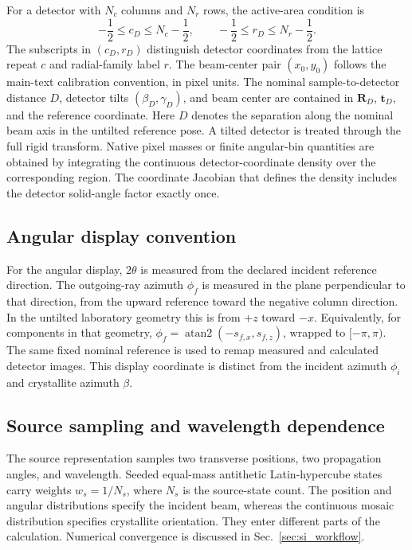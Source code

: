 For a detector with $N_c$ columns and $N_r$ rows, the active-area condition is
\begin{equation}
-\frac12\leq c_D\leq N_c-\frac12,
\qquad
-\frac12\leq r_D\leq N_r-\frac12.
\label{eq:si_detector_active_bounds}
\end{equation}
The subscripts in $(c_D,r_D)$ distinguish detector coordinates from the lattice repeat $c$ and radial-family label $r$. The beam-center pair $(x_0,y_0)$ follows the main-text calibration convention, in pixel units. The nominal sample-to-detector distance $D$, detector tilts $(\beta_D,\gamma_D)$, and beam center are contained in $\mathbf R_D$, $\mathbf t_D$, and the reference coordinate. Here $D$ denotes the separation along the nominal beam axis in the untilted reference pose. A tilted detector is treated through the full rigid transform. Native pixel masses or finite angular-bin quantities are obtained by integrating the continuous detector-coordinate density over the corresponding region. The coordinate Jacobian that defines the density includes the detector solid-angle factor exactly once.

\subsection{Angular display convention}

For the angular display, $2\theta$ is measured from the declared incident reference direction. The outgoing-ray azimuth $\phi_f$ is measured in the plane perpendicular to that direction, from the upward reference toward the negative column direction. In the untilted laboratory geometry this is from $+z$ toward $-x$. Equivalently, for components in that geometry, $\phi_f=\operatorname{atan2}(-s_{f,x},s_{f,z})$, wrapped to $[-\pi,\pi)$. The same fixed nominal reference is used to remap measured and calculated detector images. This display coordinate is distinct from the incident azimuth $\phi_i$ and crystallite azimuth $\beta$.

\subsection{Source sampling and wavelength dependence}
\label{sec:si_bandwidth_mosaic_scaling}

The source representation samples two transverse positions, two propagation angles, and wavelength. Seeded equal-mass antithetic Latin-hypercube states carry weights $w_s=1/N_s$, where $N_s$ is the source-state count. The position and angular distributions specify the incident beam, whereas the continuous mosaic distribution specifies crystallite orientation. They enter different parts of the calculation. Numerical convergence is discussed in Sec.~\ref{sec:si_workflow}.

